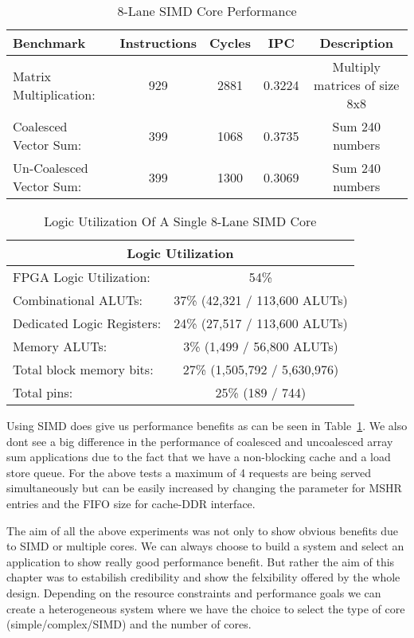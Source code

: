 \begin{table}[!htbp]
  \centering
  \begin{tabular}{|l|c|c|c|c|}
    \hline
Benchmark		&Instructions 	&Cycles		&IPC		&Description\\
    \hline
Matrix Multiplication:	&929		&2881		&0.3224 	&Multiply matrices of size 8x8\\
Coalesced Vector Sum:	&399		&1068		&0.3735 	&Sum 240 numbers\\
Un-Coalesced Vector Sum:&399		&1300		&0.3069 	&Sum 240 numbers\\
    \hline
  \end{tabular}
  \caption{8-Lane SIMD Core Performance}
  \label{table:perf3}
\end{table}

\begin{table}[!htbp]
  \centering
  \begin{tabular}{|l|c|}
    \hline
    \multicolumn{2}{|c|}{Logic Utilization} \\
    \hline
FPGA Logic Utilization:		& 54\% 	\\
   Combinational ALUTs:		& 37\% 	(42,321 / 113,600 ALUTs)\\
   Dedicated Logic Registers:	& 24\% 	(27,517 / 113,600 ALUTs)\\
   Memory ALUTs:		& 3\% 	(1,499 / 56,800 ALUTs)\\
Total block memory bits:	& 27\%  (1,505,792 / 5,630,976)\\
Total pins:			& 25\% 	(189 / 744)\\
    \hline
  \end{tabular}
  \caption{Logic Utilization Of A Single 8-Lane SIMD Core}
  \label{table:fpga_util3}
\end{table}

Using SIMD does give us performance benefits as can be seen in  Table~\ref{table:perf3}. We also dont see a big difference in the performance of coalesced and uncoalesced array sum applications due to the fact that we have a non-blocking cache and a load store queue. For the above tests a maximum of 4 requests are being served simultaneously but can be easily increased by changing the parameter for MSHR entries and the FIFO size for cache-DDR interface.

The aim of all the above experiments was not only to show obvious benefits due to SIMD or multiple cores. We can always choose to build a system and select an  application to show really good performance benefit. But rather the aim of this chapter was to estabilish credibility and show the felxibility offered by the whole design. Depending on the resource constraints and performance goals we can create a heterogeneous system where we have the choice to select the type of core (simple/complex/SIMD) and the number of cores.

